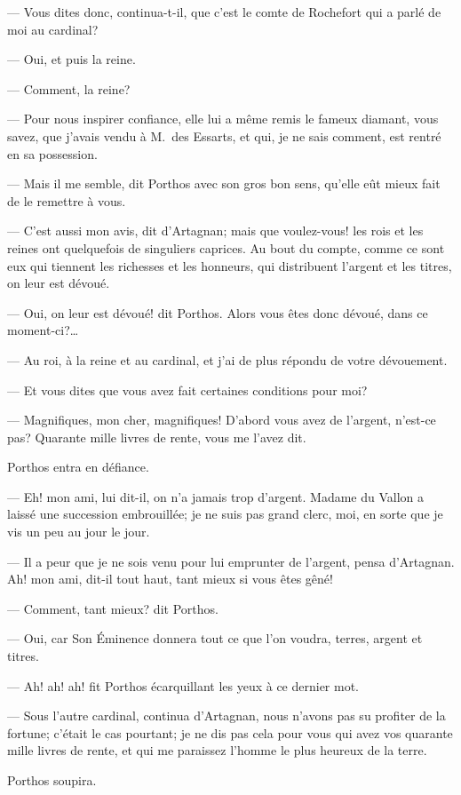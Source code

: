 — Vous dites donc, continua-t-il, que c'est le comte de Rochefort qui a parlé de moi au cardinal?

— Oui, et puis la reine.

— Comment, la reine?

— Pour nous inspirer confiance, elle lui a même remis le fameux diamant, vous savez, que j'avais vendu à M.~des Essarts, et qui, je ne sais comment, est rentré en sa possession.

— Mais il me semble, dit Porthos avec son gros bon sens, qu'elle eût mieux fait de le remettre à vous.

— C'est aussi mon avis, dit d'Artagnan; mais que voulez-vous! les rois et les reines ont quelquefois de singuliers caprices. Au bout du compte, comme ce sont eux qui tiennent les richesses et les honneurs, qui distribuent l'argent et les titres, on leur est dévoué.

— Oui, on leur est dévoué! dit Porthos. Alors vous êtes donc dévoué, dans ce moment-ci?\dots

— Au roi, à la reine et au cardinal, et j'ai de plus répondu de votre dévouement.

— Et vous dites que vous avez fait certaines conditions pour moi?

— Magnifiques, mon cher, magnifiques! D'abord vous avez de l'argent, n'est-ce pas? Quarante mille livres de rente, vous me l'avez dit.

Porthos entra en défiance.

— Eh! mon ami, lui dit-il, on n'a jamais trop d'argent. Madame du Vallon a laissé une succession embrouillée; je ne suis pas grand clerc, moi, en sorte que je vis un peu au jour le jour.

— Il a peur que je ne sois venu pour lui emprunter de l'argent, pensa d'Artagnan. Ah! mon ami, dit-il tout haut, tant mieux si vous êtes gêné!

— Comment, tant mieux? dit Porthos.

— Oui, car Son Éminence donnera tout ce que l'on voudra, terres, argent et titres.

— Ah! ah! ah! fit Porthos écarquillant les yeux à ce dernier mot.

— Sous l'autre cardinal, continua d'Artagnan, nous n'avons pas su profiter de la fortune; c'était le cas pourtant; je ne dis pas cela pour vous qui avez vos quarante mille livres de rente, et qui me paraissez l'homme le plus heureux de la terre.

Porthos soupira.

